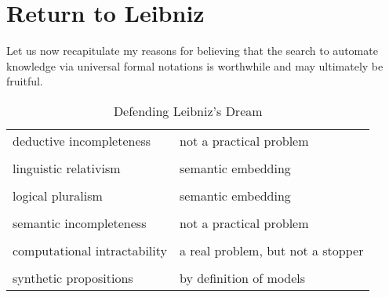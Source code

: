 \section{Return to Leibniz}


Let us now recapitulate my reasons for believing that the search to automate knowledge via universal formal notations is worthwhile and may ultimately be fruitful.

{\onecolumn
\begin{centering}
\begin{table}[h]
\begin{tabular}{p{2in} p{3in}}
deductive incompleteness & not a practical problem \\
\\
linguistic relativism & semantic embedding \\
\\
logical pluralism & semantic embedding \\
\\
semantic incompleteness & not a practical problem \\
\\
computational intractability & a real problem, but not a stopper\\
\\
synthetic propositions & by definition of models
\end{tabular}
\caption{Defending Leibniz's Dream}
\end{table}
\end{centering}
}%
